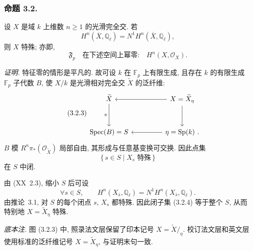 \subsubsection*{命题 3.2.}
设 $X$ 是域 $k$ 上维数 $n\geq1$ 的光滑完全交. 若
\begin{equation}\tag{3.2.1}
H^n(\overline X,\mathbb Q_\ell)=N^1H^n(\overline X,\mathbb Q_\ell),
\end{equation}
则 $X$ 特殊; 亦即,
\begin{equation}\tag{3.2.2}
\mathfrak F_p\quad\text{在下述空间上幂零:}\quad H^n(X,\mathcal O_X).
\end{equation}

\medskip
\noindent\emph{证明.}
特征零的情形是平凡的.
故可设 $k$ 在 $\mathbb F_p$ 上有限生成, 且存在 $k$ 的有限生成
$\mathbb F_p$ 子代数 $B$, 使 $X/k$ 是光滑相对完全交 $\widetilde X$ 的泛纤维:
\begin{equation}\tag{3.2.3}
\begin{tikzcd}[column sep=4.5em,row sep=3em]
\widetilde X \arrow[d,"\pi"'] &
X=\widetilde X_\eta \arrow[l] \arrow[d] \\
\operatorname{Spec}(B)=S & \eta=\operatorname{Sp}(k)\ . \arrow[l]
\end{tikzcd}
\end{equation}
$B$ 模 $R^n\pi_*(\mathcal O_{\widetilde X})$ 局部自由, 其形成与任意基变换可交换.
因此点集
\begin{equation}\tag{3.2.4}
\{\,s\in S\mid X_s\text{ 特殊}\,\}
\end{equation}
在 $S$ 中闭.

由 (XX~2.3), 缩小 $S$ 后可设
\begin{equation}\tag{3.2.5}
\forall s\in S,\qquad
H^n(X_{\bar s},\mathbb Q_\ell)=N^1H^n(X_{\bar s},\mathbb Q_\ell).
\end{equation}
由推论~3.1, 对 $S$ 的每个闭点 $s$, $X_s$ 都特殊.
因此闭子集 (3.2.4) 等于整个 $S$, 从而特别地 $X=\widetilde X_\eta$ 特殊.

\medskip
\noindent\emph{底本注.}
图 (3.2.3) 中, 照录法文层保留了印本记号 $X=\widetilde X/_{\eta}$.
校订法文层和英文层使用标准的泛纤维记号 $X=\widetilde X_\eta$, 与证明末句一致.
